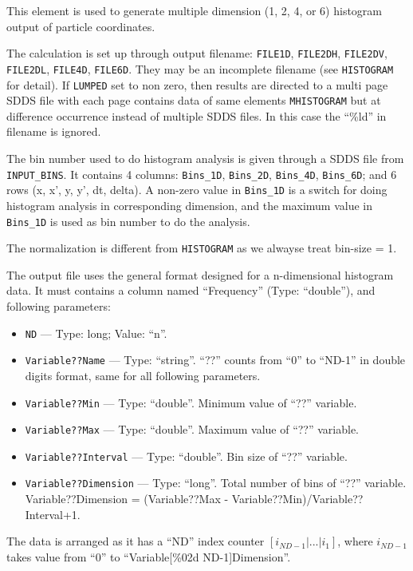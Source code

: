 This element is used to generate multiple dimension (1, 2, 4, or 6)
histogram output of particle coordinates.  

The calculation is set up through output filename: \verb|FILE1D|,
\verb|FILE2DH|, \verb|FILE2DV|, \verb|FILE2DL|, \verb|FILE4D|, \verb|FILE6D|.  
They may be an incomplete filename (see \verb|HISTOGRAM| for
detail). If \verb|LUMPED| set to non zero, then results are directed
to a multi page SDDS file with each page contains data of same
elements \verb|MHISTOGRAM| but at difference occurrence instead of
multiple SDDS files. In this case the ``\%ld'' in filename is ignored.

The bin number used to do histogram analysis is given through a SDDS
file from \verb|INPUT_BINS|. It contains 4 columns: \verb|Bins_1D|,
\verb|Bins_2D|, \verb|Bins_4D|, \verb|Bins_6D|; and 6 rows (x, x', y,
y', dt, delta). A non-zero value in \verb|Bins_1D| is a switch for
doing histogram analysis in corresponding dimension, and the maximum
value in \verb|Bins_1D| is used as bin number to do the analysis.

The normalization is different from \verb|HISTOGRAM| as we alwayse
treat bin-size = 1.


\vspace{5mm}
The output file uses the general format designed for a 
n-dimensional histogram data. It must contains a column named
``Frequency'' (Type: ``double''), and following parameters:
\begin{itemize}
\item \verb|ND| --- Type: long; Value: ``n''.
\item \verb|Variable??Name| --- Type: ``string''. ``??'' counts from ``0''
to ``ND-1'' in double digits format, same for all following parameters.
\item  \verb|Variable??Min| --- Type: ``double''. Minimum value of ``??'' variable.
\item  \verb|Variable??Max| --- Type: ``double''. Maximum value of ``??'' variable.
\item  \verb|Variable??Interval| --- Type: ``double''. Bin size of ``??'' variable.
\item  \verb|Variable??Dimension| --- Type: ``long''. Total number of bins of ``??'' variable.
     Variable??Dimension = (Variable??Max - Variable??Min)/Variable??Interval+1.
\end{itemize} 
The data is arranged as it has a ``ND'' index counter $[i_{ND-1} |
... | i_1]$, where $i_{ND-1}$ takes value from ``0'' to
``Variable[\%02d ND-1]Dimension''.
 